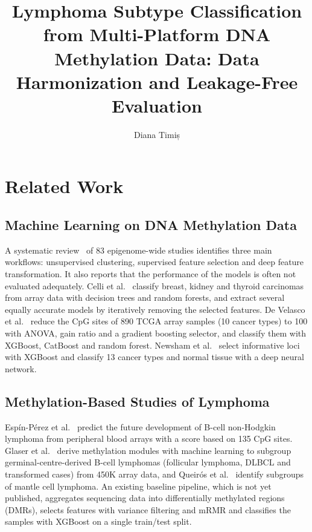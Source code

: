 \documentclass[runningheads]{llncs}
\begin{document}
\title{Lymphoma Subtype Classification from Multi-Platform DNA Methylation Data: Data Harmonization and Leakage-Free Evaluation}

\author{Diana Timiș}


\maketitle

\section{Related Work}\label{sec:related}

\subsection{Machine Learning on DNA Methylation Data}
A systematic review~\cite{yuan2023} of 83 epigenome-wide studies identifies three main workflows: unsupervised clustering, supervised feature selection and deep feature transformation. It also reports that the performance of the models is often not evaluated adequately. Celli et al.~\cite{celli2018} classify breast, kidney and thyroid carcinomas from array data with decision trees and random forests, and extract several equally accurate models by iteratively removing the selected features. De Velasco et al.~\cite{develasco2024} reduce the CpG sites of 890 TCGA array samples (10 cancer types) to 100 with ANOVA, gain ratio and a gradient boosting selector, and classify them with XGBoost, CatBoost and random forest. Newsham et al.~\cite{newsham2024} select informative loci with XGBoost and classify 13 cancer types and normal tissue with a deep neural network.

\subsection{Methylation-Based Studies of Lymphoma}
Espín-Pérez et al.~\cite{espinperez2022} predict the future development of B-cell non-Hodgkin lymphoma from peripheral blood arrays with a score based on 135 CpG sites. Glaser et al.~\cite{glaser2025} derive methylation modules with machine learning to subgroup germinal-centre-derived B-cell lymphomas (follicular lymphoma, DLBCL and transformed cases) from 450K array data, and Queirós et al.~\cite{queiros2016} identify subgroups of mantle cell lymphoma. An existing baseline pipeline, which is not yet published, aggregates sequencing data into differentially methylated regions (DMRs), selects features with variance filtering and mRMR and classifies the samples with XGBoost on a single train/test split.
\end{document}
